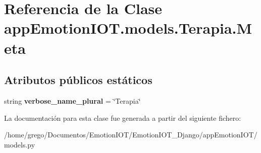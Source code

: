 \hypertarget{classappEmotionIOT_1_1models_1_1Terapia_1_1Meta}{}\section{Referencia de la Clase app\+Emotion\+I\+O\+T.\+models.\+Terapia.\+Meta}
\label{classappEmotionIOT_1_1models_1_1Terapia_1_1Meta}
\subsection*{Atributos públicos estáticos}
\begin{DoxyCompactItemize}
\item 
string {\bfseries verbose\+\_\+name\+\_\+plural} = \char`\"{}Terapia\char`\"{}\hypertarget{classappEmotionIOT_1_1models_1_1Terapia_1_1Meta_a52ac9f487139ce31268a3f3c79f81be2}{}\label{classappEmotionIOT_1_1models_1_1Terapia_1_1Meta_a52ac9f487139ce31268a3f3c79f81be2}

\end{DoxyCompactItemize}


La documentación para esta clase fue generada a partir del siguiente fichero\+:\begin{DoxyCompactItemize}
\item 
/home/grego/\+Documentos/\+Emotion\+I\+O\+T/\+Emotion\+I\+O\+T\+\_\+\+Django/app\+Emotion\+I\+O\+T/models.\+py\end{DoxyCompactItemize}

